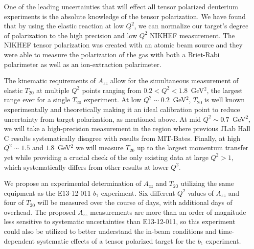 One of the leading uncertainties that will effect all tensor polarized deuterium experiments is the absolute knowledge of the tensor polarization.   We have found that by using the elastic reaction at low $Q^2$, we can normalize our target's degree of polarization to the high precision and low $Q^2$ NIKHEF measurement.  The NIKHEF tensor polarization was created with an atomic beam source and they were able to measure the polarization of the gas with both a Briet-Rabi polarimeter as well as an ion-extraction polarimeter. 

The kinematic requirements of $A_{zz}$ allow for the simultaneous measurement of elastic $T_{20}$ at multiple $Q^2$ points ranging from $0.2<Q^2<1.8$~GeV$^2$, the largest range ever for a single $T_{20}$ experiment. At low $Q^2\sim0.2$~GeV$^2$, $T_{20}$ is well known experimentally and theoretically making it an ideal calibration point to reduce uncertainty from target polarization, as mentioned above. At mid $Q^2\sim0.7$~GeV$^2$, we will take a high-precision measurement in the region where previous JLab Hall C results systematically disagree with results from MIT-Bates. Finally, at high $Q^2\sim1.5$ and $1.8$~GeV$^2$ we will measure $T_{20}$ up to the largest momentum transfer yet while providing a crucial check of the only existing data at large $Q^2>1$, which systematically differs from other results at lower $Q^2$.

We propose an experimental determination of $A_{zz}$ and $T_{20}$ utilizing the same equipment as the E13-12-011 $b_1$ experiment.  Six different $Q^2$ values of $A_{zz}$ and four of $T_{20}$ will be measured over the course of \productiondays days, with \overheaddays additional days of overhead. The proposed $A_{zz}$ measurements are more than an order of magnitude less sensitive to systematic uncertainties than E13-12-011, so this experiment could also be utilized to better understand the in-beam conditions and time-dependent systematic effects of a tensor polarized target for the $b_1$ experiment.










